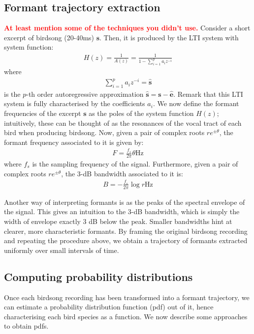\documentclass[pdftex,11pt,a4paper]{article}
\theoremstyle{definition}
\theoremstyle{remark}
\newcommand*{\V}[1]{\mathbf{#1}}%
\begin{document}
\subsection{Formant trajectory extraction}
\par \textcolor{red}{\textbf{At least mention some of the techniques you didn't use.}} Consider a short excerpt of birdsong (20-40ms) $\V{s}$. Then, it is produced by the LTI system with system function:
\begin{align*}
H(z) = \frac{1}{A(z)} = \frac{1}{1-\sum_{i=1}^pa_iz^{-i}}
\end{align*}
where 
\begin{align*}
\sum_{i=1}^pa_iz^{-i} = \V{\hat{s}}
\end{align*}
is the $p$-th order autoregressive approximation $\V{\hat{s}} = \V{s} - \V{\hat{e}}$. Remark that this LTI system is fully characterised by the coefficients $a_i$. We now define the formant frequencies of the excerpt $\V{s}$ as the poles of the system function $H(z)$; intuitively, these can be thought of as the resonances of the vocal tract of each bird when producing birdsong. Now, given a pair of complex roots $re^{\pm\theta}$, the formant frequency associated to it is given by:
\begin{align*}
F = \frac{f_s}{2\pi}\theta \text{Hz}
\end{align*}
where $f_s$ is the sampling frequency of the signal. Furthermore, given a pair of complex roots $re^{\pm\theta}$, the 3-dB bandwidth associated to it is:
\begin{align*}
B = -\frac{f_s}{2\pi}\log{r} \text{Hz}
\end{align*}
\par Another way of interpreting formants is as the peaks of the spectral envelope of the signal. This gives an intuition to the 3-dB bandwidth, which is simply the width of envelope exactly 3 dB below the peak. Smaller bandwidths hint at clearer, more characteristic formants. By framing the original birdsong recording and repeating the procedure above, we obtain a trajectory of formants extracted uniformly over small intervals of time. 

\subsection{Computing probability distributions}
Once each birdsong recording has been transformed into a formant trajectory, we can estimate a probability distribution function (pdf) out of it, hence characterising each bird species as a function. We now describe some approaches to obtain pdfs.
\end{document}

